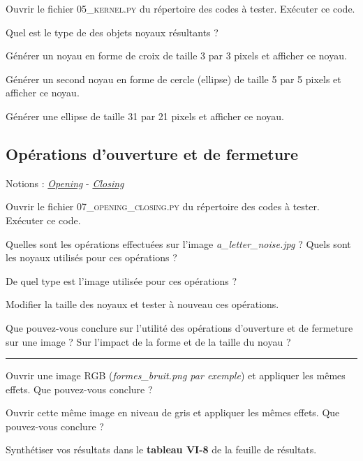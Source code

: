 \Manip Ouvrir le fichier \textsc{05\_kernel.py} du répertoire des codes à tester. Exécuter ce code.

\Quest Quel est le type de des objets noyaux résultants ?

\Manip Générer un noyau en forme de croix de taille 3 par 3 pixels et afficher ce noyau.

\Manip Générer un second noyau en forme de cercle (ellipse) de taille 5 par 5 pixels et afficher ce noyau.

\Manip Générer une ellipse de taille 31 par 21 pixels et afficher ce noyau.

\newpage
\subsection{Opérations d'ouverture et de fermeture}

\begin{mdframed}[style=sidebar,frametitle={}]
Notions : \href{https://iogs-lense-training.github.io/image-processing/contents/opencv_open_close.html#opening-operation}{\textit{Opening}} - \href{https://iogs-lense-training.github.io/image-processing/contents/opencv_open_close.html#closing-operation}{\textit{Closing}} 
\end{mdframed}

\Manip Ouvrir le fichier \textsc{07\_opening\_closing.py} du répertoire des codes à tester. Exécuter ce code.

\Quest Quelles sont les opérations effectuées sur l'image \textsl{a\_letter\_noise.jpg} ? Quels sont les noyaux utilisés pour ces opérations ?

\Quest De quel type est l'image utilisée pour ces opérations ?

\Manip Modifier la taille des noyaux et tester à nouveau ces opérations.

\Quest Que pouvez-vous conclure sur l'utilité des opérations d'ouverture et de fermeture sur une image ? Sur l'impact de la forme et de la taille du noyau ?

\noindent \rule{\linewidth}{1pt}

\Manip Ouvrir une image RGB (\textit{formes\_bruit.png par exemple}) et appliquer les mêmes effets. Que pouvez-vous conclure ?

\Manip Ouvrir cette même image en niveau de gris et appliquer les mêmes effets. Que pouvez-vous conclure ?

\Manip Synthétiser vos résultats dans le \textbf{tableau VI-8} de la feuille de résultats. 


